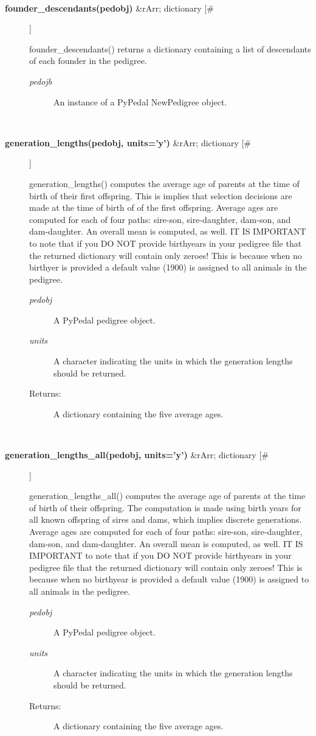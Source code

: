 \begin{description}
\begin{description}
\end{description}
\\ 

\item[\textbf{founder\_descendants(pedobj)}
 \&rArr; dictionary [\#]]

 founder\_descendants() returns a dictionary containing a list of descendants of each founder in the pedigree.
\begin{description}
\item[\emph{pedojb}
] An instance of a PyPedal NewPedigree object.

\end{description}
\\ 

\item[\textbf{generation\_lengths(pedobj, units='y')}
 \&rArr; dictionary [\#]]

 generation\_lengths() computes the average age of parents at the time of birth of their first offspring. This is implies that selection decisions are made at the time of birth of of the first offspring. Average ages are computed for each of four paths: sire-son, sire-daughter, dam-son, and dam-daughter. An overall mean is computed, as well. IT IS IMPORTANT to note that if you DO NOT provide birthyears in your pedigree file that the returned dictionary will contain only zeroes! This is because when no birthyer is provided a default value (1900) is assigned to all animals in the pedigree.
\begin{description}
\item[\emph{pedobj}
] A PyPedal pedigree object.
\item[\emph{units}
] A character indicating the units in which the generation lengths should be returned.
\item[Returns:] A dictionary containing the five average ages.

\end{description}
\\ 

\item[\textbf{generation\_lengths\_all(pedobj, units='y')}
 \&rArr; dictionary [\#]]

 generation\_lengths\_all() computes the average age of parents at the time of birth of their offspring. The computation is made using birth years for all known offspring of sires and dams, which implies discrete generations. Average ages are computed for each of four paths: sire-son, sire-daughter, dam-son, and dam-daughter. An overall mean is computed, as well. IT IS IMPORTANT to note that if you DO NOT provide birthyears in your pedigree file that the returned dictionary will contain only zeroes! This is because when no birthyear is provided a default value (1900) is assigned to all animals in the pedigree.
\begin{description}
\item[\emph{pedobj}
] A PyPedal pedigree object.
\item[\emph{units}
] A character indicating the units in which the generation lengths should be returned.
\item[Returns:] A dictionary containing the five average ages.


\end{description}
\end{description}
